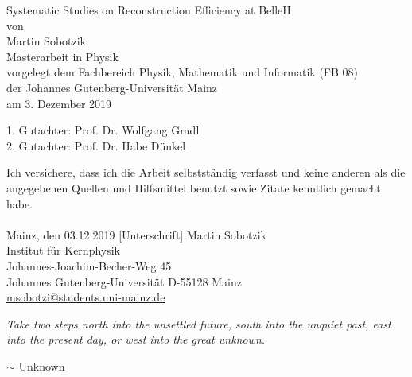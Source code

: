 \documentclass[a4paper,11pt,twosided,final,german,openbib,pdftex,listof=totoc,bibliography=totoc]{scrbook}
\newcommand\blankpage{%
	\null
	\thispagestyle{empty}%
	\addtocounter{page}{-1}%
	\newpage}
\begin{document}

\begin{titlepage}
  \vspace*{6mm}
  \begin{center}
     {\afont Systematic Studies on Reconstruction Efficiency at BelleII}
     \\[3.5cm]
     {\large von}
     \\[3.5cm]
     {\dfont Martin Sobotzik}
     \\[2cm]
     {\large Masterarbeit in Physik \/\\
        vorgelegt dem Fachbereich Physik, Mathematik und Informatik (FB 08) \/\\
        der Johannes Gutenberg-Universit\"at Mainz \/\\
        am 3. Dezember 2019}
   \end{center}
   \vfill
   1. Gutachter: Prof. Dr. Wolfgang Gradl\\	
   2. Gutachter: Prof. Dr. Habe D\"unkel \\
   \vfill

\afterpage{\blankpage}


\end{titlepage}
\newpage


 

\thispagestyle{empty}
Ich versichere, dass ich die Arbeit selbstst\"andig verfasst und keine 
anderen als die angegebenen Quellen und Hilfsmittel benutzt sowie 
Zitate kenntlich gemacht habe.
\\
\\[3.5cm] 
Mainz, den 03.12.2019 [Unterschrift]
\vfill
\noindent 
Martin Sobotzik\\
Institut f\"ur Kernphysik\\
Johannes-Joachim-Becher-Weg 45\\
Johannes Gutenberg-Universit\"at
D-55128 Mainz\\
{\href{msobotzi@students.uni-mainz.de}{msobotzi@students.uni-mainz.de}}




\afterpage{\blankpage}

\newpage

\epigraph{\textit{Take two steps north into the unsettled future, south into the unquiet past, east into the present day, or west into the great unknown.}}{$\sim$ Unknown}
\end{document}
